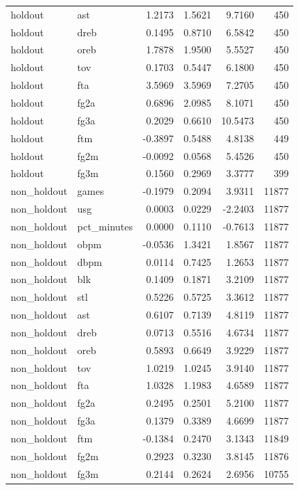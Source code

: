 \begin{table}
\begin{tabular}{llrrrr}
holdout & ast & 1.2173 & 1.5621 & 9.7160 & 450 \\
holdout & dreb & 0.1495 & 0.8710 & 6.5842 & 450 \\
holdout & oreb & 1.7878 & 1.9500 & 5.5527 & 450 \\
holdout & tov & 0.1703 & 0.5447 & 6.1800 & 450 \\
holdout & fta & 3.5969 & 3.5969 & 7.2705 & 450 \\
holdout & fg2a & 0.6896 & 2.0985 & 8.1071 & 450 \\
holdout & fg3a & 0.2029 & 0.6610 & 10.5473 & 450 \\
holdout & ftm & -0.3897 & 0.5488 & 4.8138 & 449 \\
holdout & fg2m & -0.0092 & 0.0568 & 5.4526 & 450 \\
holdout & fg3m & 0.1560 & 0.2969 & 3.3777 & 399 \\
non\_holdout & games & -0.1979 & 0.2094 & 3.9311 & 11877 \\
non\_holdout & usg & 0.0003 & 0.0229 & -2.2403 & 11877 \\
non\_holdout & pct\_minutes & 0.0000 & 0.1110 & -0.7613 & 11877 \\
non\_holdout & obpm & -0.0536 & 1.3421 & 1.8567 & 11877 \\
non\_holdout & dbpm & 0.0114 & 0.7425 & 1.2653 & 11877 \\
non\_holdout & blk & 0.1409 & 0.1871 & 3.2109 & 11877 \\
non\_holdout & stl & 0.5226 & 0.5725 & 3.3612 & 11877 \\
non\_holdout & ast & 0.6107 & 0.7139 & 4.8119 & 11877 \\
non\_holdout & dreb & 0.0713 & 0.5516 & 4.6734 & 11877 \\
non\_holdout & oreb & 0.5893 & 0.6649 & 3.9229 & 11877 \\
non\_holdout & tov & 1.0219 & 1.0245 & 3.9140 & 11877 \\
non\_holdout & fta & 1.0328 & 1.1983 & 4.6589 & 11877 \\
non\_holdout & fg2a & 0.2495 & 0.2501 & 5.2100 & 11877 \\
non\_holdout & fg3a & 0.1379 & 0.3389 & 4.6699 & 11877 \\
non\_holdout & ftm & -0.1384 & 0.2470 & 3.1343 & 11849 \\
non\_holdout & fg2m & 0.2923 & 0.3230 & 3.8145 & 11876 \\
non\_holdout & fg3m & 0.2144 & 0.2624 & 2.6956 & 10755 \\
\bottomrule
\end{tabular}
\end{table}
